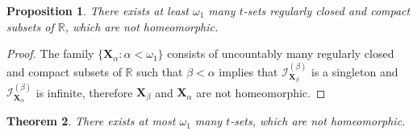 \documentclass[12pt,a4paper,leqno]{amsart}
\newtheorem{thm}{Theorem}
\newtheorem{pro}[thm]{Proposition}
\theoremstyle{definition}
\begin{document}
	
  \begin{pro}\label{p26}
   There exists at least  $\omega_1$ many  $ t $-sets  regularly closed and compact subsets of $ \mathbb R$, which are not homeomorphic. \end{pro}
\begin{proof} The family $\{\textbf{X}_\alpha \colon \alpha < \omega_1\}$ consists of uncountably many regularly closed and compact subsets of $\mathbb R$ such that $\beta <\alpha$ implies that $\mathcal I^{(\beta)}_{\textbf{X}_\beta}$ is a singleton  and $\mathcal I^{(\beta)}_{\textbf{X}_\alpha}$ is infinite, therefore $\textbf{X}_\beta$ and $\textbf{X}_\alpha$ are not homeomorphic.   \end{proof}


\begin{thm}\label{t28} 
   There exists at most  $\omega_1$ many  $ t $-sets, which are not homeomorphic.
	\end{thm}
\end{document}
